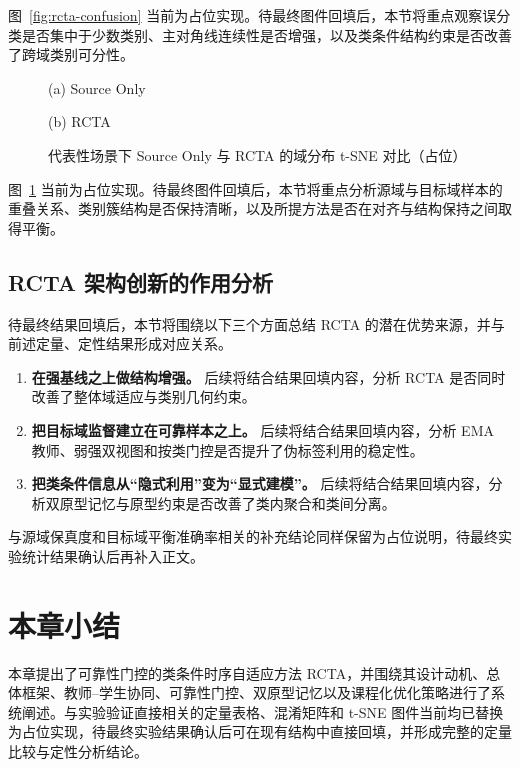 图~\ref{fig:rcta-confusion} 当前为占位实现。待最终图件回填后，本节将重点观察误分类是否集中于少数类别、主对角线连续性是否增强，以及类条件结构约束是否改善了跨域类别可分性。

\begin{figure}[htbp]
\centering
\begin{minipage}{0.49\textwidth}
\centering
{}
\par
\footnotesize (a) Source Only
\end{minipage}
\hfill
\begin{minipage}{0.49\textwidth}
\centering
{}
\par
\footnotesize (b) RCTA
\end{minipage}
\caption{代表性场景下 Source Only 与 RCTA 的域分布 t-SNE 对比（占位）}
\label{fig:rcta-tsne}
\end{figure}

图~\ref{fig:rcta-tsne} 当前为占位实现。待最终图件回填后，本节将重点分析源域与目标域样本的重叠关系、类别簇结构是否保持清晰，以及所提方法是否在对齐与结构保持之间取得平衡。

\subsection{RCTA 架构创新的作用分析}
待最终结果回填后，本节将围绕以下三个方面总结 RCTA 的潜在优势来源，并与前述定量、定性结果形成对应关系。

\begin{enumerate}
\item \textbf{在强基线之上做结构增强。} 后续将结合结果回填内容，分析 RCTA 是否同时改善了整体域适应与类别几何约束。
\item \textbf{把目标域监督建立在可靠样本之上。} 后续将结合结果回填内容，分析 EMA 教师、弱强双视图和按类门控是否提升了伪标签利用的稳定性。
\item \textbf{把类条件信息从“隐式利用”变为“显式建模”。} 后续将结合结果回填内容，分析双原型记忆与原型约束是否改善了类内聚合和类间分离。
\end{enumerate}

与源域保真度和目标域平衡准确率相关的补充结论同样保留为占位说明，待最终实验统计结果确认后再补入正文。

\section{本章小结}
本章提出了可靠性门控的类条件时序自适应方法 RCTA，并围绕其设计动机、总体框架、教师--学生协同、可靠性门控、双原型记忆以及课程化优化策略进行了系统阐述。与实验验证直接相关的定量表格、混淆矩阵和 t-SNE 图件当前均已替换为占位实现，待最终实验结果确认后可在现有结构中直接回填，并形成完整的定量比较与定性分析结论。
